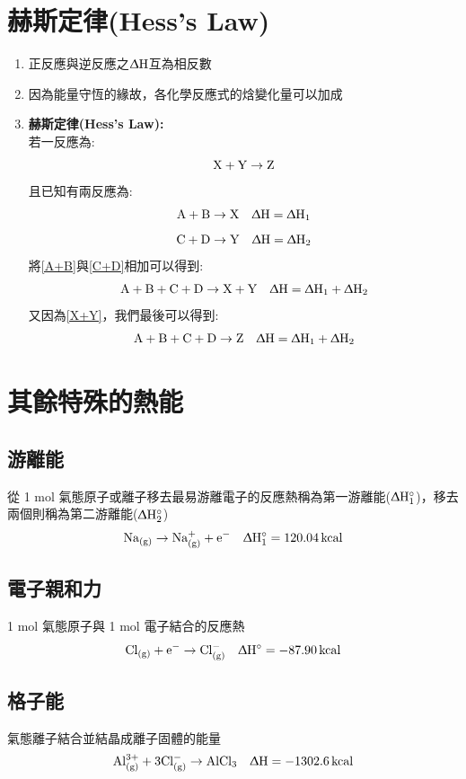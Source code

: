 \section{赫斯定律(Hess's Law)}
\begin{enumerate}
\item 正反應與逆反應之$\Updelta \rm H$互為相反數
\item 因為能量守恆的緣故，各化學反應式的焓變化量可以加成
\item \textbf{赫斯定律(Hess's Law):} \\
若一反應為:
\begin{equation}
\rm X + \rm Y \rightarrow \rm Z \label{X+Y}
\end{equation}
且已知有兩反應為:
\begin{equation}
\rm A + B \rightarrow  X \quad \Updelta  H=\Updelta  H_1 \label{A+B}
\end{equation}
\begin{equation}
\rm C + D \rightarrow  Y \quad \Updelta  H=\Updelta  H_2 \label{C+D}
\end{equation}
將\eqref{A+B}與\eqref{C+D}相加可以得到:
\begin{equation}
\rm A+B+C+D \rightarrow  X+Y \quad \Updelta  H = \Updelta H_1 + \Updelta  H_2
\end{equation}
又因為\eqref{X+Y}，我們最後可以得到:
\begin{equation}
\rm A+B+C+D \rightarrow  Z \quad \Updelta  H = \Updelta H_1 + \Updelta  H_2 
\end{equation}

\end{enumerate}
\section{其餘特殊的熱能}
\subsection{游離能}
從 1 mol 氣態原子或離子移去最易游離電子的反應熱稱為第一游離能($\rm \Updelta H^{\circ}_1$)，移去兩個則稱為第二游離能($\rm \Updelta H^{\circ}_2$)
$$ \rm Na_{(g)} \rightarrow Na^{+}_{(g)}+e^- \quad \Updelta H^{\circ}_1 = 120.04 \, kcal $$
\subsection{電子親和力}
1 mol 氣態原子與 1 mol 電子結合的反應熱
$$ \rm Cl_{(g)} + e^- \rightarrow Cl^-_{(g)} \quad \Updelta \rm H^{\circ}=-87.90 \, kcal$$
\subsection{格子能}氣態離子結合並結晶成離子固體的能量
$$\rm Al^{3+}_{(g)}+3Cl^-_{(g)}\rightarrow AlCl_3 \quad \Updelta H=-1302.6 \, kcal $$
